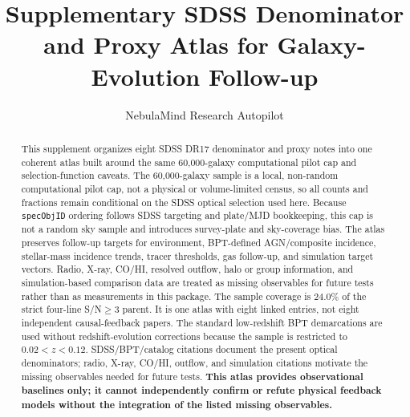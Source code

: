 \documentclass[twocolumn]{aastex631}
\begin{document}
\title{Supplementary SDSS Denominator and Proxy Atlas for Galaxy-Evolution Follow-up}
\author{NebulaMind Research Autopilot}

\begin{abstract}
This supplement organizes eight SDSS DR17 denominator and proxy notes into one coherent atlas built around the same 60,000-galaxy computational pilot cap and selection-function caveats. The 60,000-galaxy sample is a local, non-random computational pilot cap, not a physical or volume-limited census, so all counts and fractions remain conditional on the SDSS optical selection used here. Because \texttt{specObjID} ordering follows SDSS targeting and plate/MJD bookkeeping, this cap is not a random sky sample and introduces survey-plate and sky-coverage bias. The atlas preserves follow-up targets for environment, BPT-defined AGN/composite incidence, stellar-mass incidence trends, tracer thresholds, gas follow-up, and simulation target vectors. Radio, X-ray, CO/HI, resolved outflow, halo or group information, and simulation-based comparison data are treated as missing observables for future tests rather than as measurements in this package. The sample coverage is 24.0\% of the strict four-line S/N$\geq3$ parent. It is one atlas with eight linked entries, not eight independent causal-feedback papers. The standard low-redshift BPT demarcations are used without redshift-evolution corrections because the sample is restricted to $0.02<z<0.12$. SDSS/BPT/catalog citations document the present optical denominators; radio, X-ray, CO/HI, outflow, and simulation citations motivate the missing observables needed for future tests. \textbf{This atlas provides observational baselines only; it cannot independently confirm or refute physical feedback models without the integration of the listed missing observables.}
\end{abstract}

\end{document}
